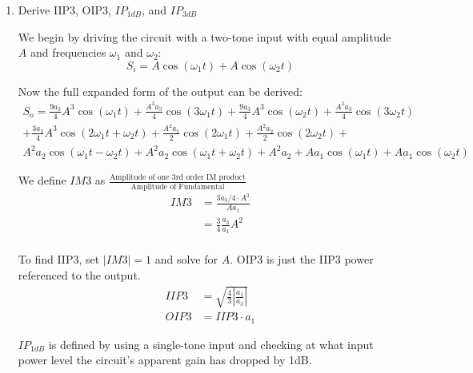 \begin{enumerate}[label=(\alph*)]
    \item {\color{blue} Derive IIP3, OIP3, $IP_{1dB}$, and $IP_{3dB}$}

    We begin by driving the circuit with a two-tone input with equal amplitude $A$ and frequencies $\omega_1$ and $\omega_2$:
    $$ S_i = A \cos{\left (\omega_1 t \right )} + A \cos{\left (\omega_2 t \right )} $$

    Now the full expanded form of the output can be derived:
    \begin{align*}
    S_o = \frac{9 a_{3}}{4} A^{3} \cos{\left (\omega_1 t \right )} + \frac{A^{3} a_{3}}{4} \cos{\left (3 \omega_1 t \right )} + \frac{9 a_{3}}{4} A^{3} \cos{\left (\omega_2 t \right )} + \frac{A^{3} a_{3}}{4} \cos{\left (3 \omega_2 t \right )} \\
        + \frac{3 a_{3}}{4} A^{3} \cos{\left (2 \omega_1 t + \omega_2 t \right )} + \frac{A^{2} a_{2}}{2} \cos{\left (2 \omega_1 t \right )} + \frac{A^{2} a_{2}}{2} \cos{\left (2 \omega_2 t \right )} + \\
        A^{2} a_{2} \cos{\left (\omega_1 t - \omega_2 t \right )} + A^{2} a_{2} \cos{\left (\omega_1 t + \omega_2 t \right )} + A^{2} a_{2} + A a_{1} \cos{\left (\omega_1 t \right )} + A a_{1} \cos{\left (\omega_2 t \right )}
    \end{align*}

    We define $IM3$ as $\frac{\text{Amplitude of one 3rd order IM product}}{\text{Amplitude of Fundamental}}$
    \begin{align*}
        IM3 &= \frac{3 a_3 / 4 \cdot A^3}{A a_1} \\
        &= \frac{3}{4} \frac{a_3}{a_1} A^2 \\
    \end{align*}

    To find IIP3, set $|IM3| = 1$ and solve for $A$. OIP3 is just the IIP3 power referenced to the output.
    \begin{align*}
        IIP3 &= \sqrt{\frac{4}{3} |\frac{a_1}{a_3}|} \\
        OIP3 &= IIP3 \cdot a_1
    \end{align*}

    $IP_{1dB}$ is defined by using a single-tone input and checking at what input power level the circuit's apparent gain has dropped by 1dB.


\end{enumerate}
